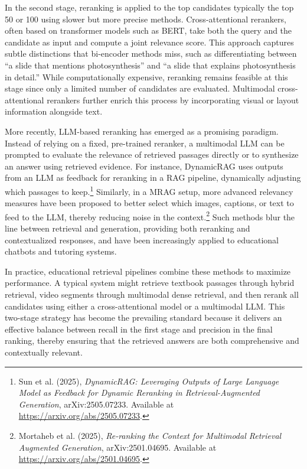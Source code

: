 In the second stage, reranking is applied to the top candidates typically the top 50 or 100 using slower but more precise methods. Cross-attentional rerankers, often based on transformer models such as BERT, take both the query and the candidate as input and compute a joint relevance score. This approach captures subtle distinctions that bi-encoder methods miss, such as differentiating between “a slide that mentions photosynthesis” and “a slide that explains photosynthesis in detail.” While computationally expensive, reranking remains feasible at this stage since only a limited number of candidates are evaluated. Multimodal cross-attentional rerankers further enrich this process by incorporating visual or layout information alongside text.

More recently, LLM-based reranking has emerged as a promising paradigm. Instead of relying on a fixed, pre-trained reranker, a multimodal LLM can be prompted to evaluate the relevance of retrieved passages directly or to synthesize an answer using retrieved evidence. For instance, DynamicRAG uses outputs from an LLM as feedback for reranking in a RAG pipeline, dynamically adjusting which passages to keep.\footnote{Sun et al. (2025), \emph{DynamicRAG: Leveraging Outputs of Large Language Model as Feedback for Dynamic Reranking in Retrieval-Augmented Generation}, arXiv:2505.07233. Available at \url{https://arxiv.org/abs/2505.07233}.} Similarly, in a MRAG setup, more advanced relevancy measures have been proposed to better select which images, captions, or text to feed to the LLM, thereby reducing noise in the context.\footnote{Mortaheb et al. (2025), \emph{Re-ranking the Context for Multimodal Retrieval Augmented Generation}, arXiv:2501.04695. Available at \url{https://arxiv.org/abs/2501.04695}.} Such methods blur the line between retrieval and generation, providing both reranking and contextualized responses, and have been increasingly applied to educational chatbots and tutoring systems.

In practice, educational retrieval pipelines combine these methods to maximize performance. A typical system might retrieve textbook passages through hybrid retrieval, video segments through multimodal dense retrieval, and then rerank all candidates using either a cross-attentional model or a multimodal LLM. This two-stage strategy has become the prevailing standard because it delivers an effective balance between recall in the first stage and precision in the final ranking, thereby ensuring that the retrieved answers are both comprehensive and contextually relevant.


